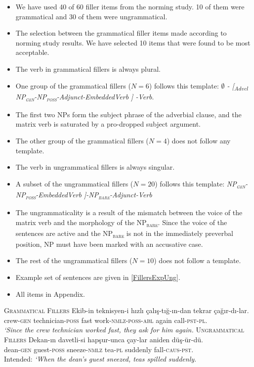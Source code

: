 \documentclass[
  10pt,
  english,
  doc,floatsintext]{apa6}
\providecommand{\tightlist}{%
  \setlength{\itemsep}{0pt}\setlength{\parskip}{0pt}}
\begin{document}
\begin{itemize}
\tightlist
\item
  We have used 40 of 60 filler items from the norming study. 10 of them were grammatical and 30 of them were ungrammatical.
\item
  The selection between the grammatical filler items made according to norming study results. We have selected 10 items that were found to be most acceptable.
\item
  The verb in grammatical fillers is always plural.
\item
  One group of the grammatical fillers (\(N=6\)) follows this template: \newline \emph{$\emptyset$ - [\textsubscript{Advcl} NP\textsubscript{\textsc{gen}}-NP\textsubscript{\textsc{poss}}-Adjunct-EmbeddedVerb ] -Verb}.
\item
  The first two NPs form the subject phrase of the adverbial clause, and the matrix verb is saturated by a pro-dropped subject argument.
\item
  The other group of the grammatical fillers (\(N=4\)) does not follow any template.
\item
  The verb in ungrammatical fillers is always singular.
\item
  A subset of the ungrammatical fillers (\(N=20\)) follows this template: \newline \emph{NP\textsubscript{\textsc{gen}}-NP\textsubscript{\textsc{poss}}-EmbeddedVerb ]-NP\textsubscript{\textsc{bare}}-Adjunct-Verb}
\item
  The ungrammaticality is a result of the mismatch between the voice of the matrix verb and the morphology of the NP\textsubscript{\textsc{bare}}. Since the voice of the sentences are active and the NP\textsubscript{\textsc{bare}} is not in the immediately preverbal position, NP must have been marked with an accusative case.
\item
  The rest of the ungrammatical fillers (\(N=10\)) does not follow a template.
\item
  Example set of sentences are given in \ref{FillersExpUng}.
\item
  All items in Appendix.
\end{itemize}

\begin{exe}
\ex \label{FillersExpUng}
\begin{xlist}
\ex \textsc{Grammatical Fillers}
\gll Ekib-in teknisyen-i hızlı çalış-tığ-ın-dan tekrar çağır-dı-lar.\\
crew-\textsc{gen} technician-\textsc{poss} fast work-\textsc{nmlz}-\textsc{poss}-\textsc{abl} again call-\textsc{pst}-\textsc{pl}.\\
\glt \textit{`Since the crew technician worked fast, they ask for him again.}
\ex \textsc{Ungrammatical Fillers}
\gll *Dekan-ın davetli-si hapşur-unca çay-lar aniden düş-ür-dü.\\
dean-\textsc{gen} guest-\textsc{poss} sneeze-\textsc{nmlz} tea-\textsc{pl} suddenly fall-\textsc{caus}-\textsc{pst}. \\
\glt Intended: \textit{`When the dean's guest sneezed, teas spilled suddenly.}
\end{xlist}
\end{exe}
\end{document}
